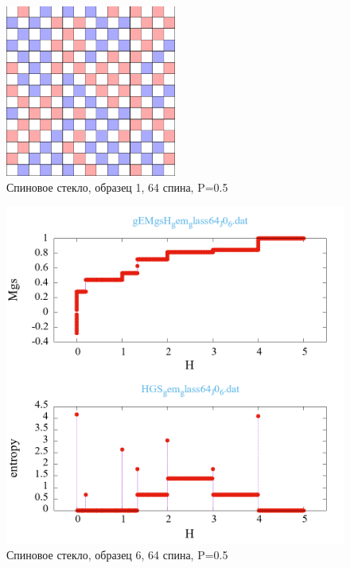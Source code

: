 \documentclass[utf8, babel, sor, jor, amsmath, amssymb, reprint]{elsarticle} %
\begin{document}
\begin{figure}[H]
	\centering
	\includegraphics[width=0.5\textwidth]{cell_SG_64_J0_6.png}
	\caption{Спиновое стекло, образец 1, 64 спина, P=0.5}
	\label{fig:cell_SG_64_J0_6.png}
\end{figure}

\begin{figure}[H]
	\centering
	\includegraphics[width=1\textwidth]{_multiplot_SG64_J0_6.dat.png}
	\caption{Спиновое стекло, образец 6, 64 спина, P=0.5}
	\label{fig:_multiplot_SG64_J0_6.dat.png}
\end{figure}
\end{document}

